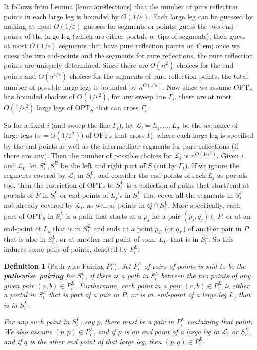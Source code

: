\documentclass[pdflatex,sn-mathphys-num]{sn-jnl}
\theoremstyle{thmstyleone}
\newtheorem{definition}{Definition} %
\newcommand{\eps}{\varepsilon}
\newcommand{\OPT}{{\text{OPT}}}
\begin{document}
It follows from Lemma \ref{lemma:reflections} that the number of pure reflection points in each large leg is bounded by $O(1/\eps)$. Each large leg can be guessed by making at most $O(1/\eps)$ guesses for segments or points: guess the two end-points of the large leg (which are either portals or tips of segments), then guess at most $O(1/\eps)$ segments that have pure reflection points on them; once we guess the two end-points and the segments for pure reflections, the pure reflection points are uniquely determined. Since there are $O(n^2)$ choices for the end-points and $O(n^{1/\eps})$ choices for the segments of pure reflection points, the total number of possible large legs is bounded by $n^{O(1/\eps)}$. 
Now since we assume $\OPT_S$ has bounded shadow of $O(1/\eps^2)$, for any sweep line $\Gamma_i$, there are at most $O(1/\eps^2)$ large legs of $\OPT_S$ that can cross $\Gamma_i$. 

So for a fixed $i$ (and sweep the line $\Gamma_i$), let
$\mathcal L_i= L_1,\ldots,L_\sigma$ be the sequence of large legs ($\sigma=O(1/{\eps^2})$) of $\OPT_S$
that cross $\Gamma_i$; where each large leg is specified by the end-points as well as the intermediate segments for pure reflections (if there are any). Then the number of possible choices for $\mathcal L_i$ is $n^{O(1/\eps^3)}$. 
Given $i$ and $\mathcal L_i$, let $S^L_{i},S^R_i$ be the left and right part of $S$ (cut by $\Gamma_i$).
If we ignore the segments covered by $\mathcal L_i$ in $S^L_i$, and consider
the end-points of each $L_j$ as portals too, then the restriction of $\OPT_S$ to $S^L_i$ is a collection of paths that start/end at portals of $P$ in $S^L_i$ or end-points of $L_j$'s in $S^L_i$
that cover all the segments in $S^L_i$ not already covered by $\mathcal L_i$, as well as points in $Q\cap S^L_i$.
More specifically, each part of $\OPT_S$ in $S^L_i$ is a path that starts at a $p_j$ for a pair $(p_j,q_j)\in P$, or  at an end-point of $L_k$ that is in $S^L_i$ and ends at a point $p_{j'}$ (or $q_{j'}$) of another pair
in $P$ that is also in $S^L_i$, or at another end-point of some $L_{k'}$ that is in $S^L_i$. So this induces
some pairs of points, denoted by $P^L_i$:
\begin{definition}[Path-wise Pairing $ P^L_i $]
	Set $ P^L_i $ of pairs of points is said to be the \textbf{path-wise pairing} for $ S^L_i $, if there is a path in $ S^L_i $ between the two points of any given pair $ (a, b)\in P^L_i $. 
	Furthermore, each point in a pair $(a,b)\in P^L_i$ is either a portal in $S^L_i$ that is part of a pair in $P$,
	or is an end-point of a large leg $L_j$ that is in $S^L_i$. 
	
	For any such point in $ S^L_i $, say $ p $, there must be a pair in $ P^L_i $ containing that point. We also assume $ (p, p)\in P^L_i $, and if $ p $ is an end point of a large leg in $ \mathcal L_i $ or $ S_i^L $, and if $ q $ is the other end point of that large leg, then $ (p, q)\in P^L_i $.
\end{definition}
\end{document}
